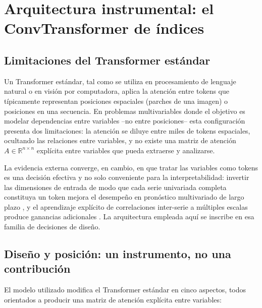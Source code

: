 
\section{Arquitectura instrumental: el ConvTransformer de índices}

\subsection{Limitaciones del Transformer estándar}

Un Transformer estándar, tal como se utiliza en procesamiento de lenguaje natural o en visión por computadora, aplica la atención entre tokens que típicamente representan posiciones espaciales (parches de una imagen) o posiciones en una secuencia. En problemas multivariables donde el objetivo es modelar dependencias entre variables --no entre posiciones-- esta configuración presenta dos limitaciones: la atención se diluye entre miles de tokens espaciales, ocultando las relaciones entre variables, y no existe una matriz de atención $A \in \mathbb{R}^{n\times n}$ explícita entre variables que pueda extraerse y analizarse.

La evidencia externa converge, en cambio, en que tratar las variables como tokens es una decisión efectiva y no solo conveniente para la interpretabilidad: invertir las dimensiones de entrada de modo que cada serie univariada completa constituya un token mejora el desempeño en pronóstico multivariado de largo plazo \cite{liu2024itransformer}, y el aprendizaje explícito de correlaciones inter-serie a múltiples escalas produce ganancias adicionales \cite{cai2024msgnet}. La arquitectura empleada aquí se inscribe en esa familia de decisiones de diseño.

\subsection{Diseño y posición: un instrumento, no una contribución}

El modelo utilizado modifica el Transformer estándar en cinco aspectos, todos orientados a producir una matriz de atención explícita entre variables:

